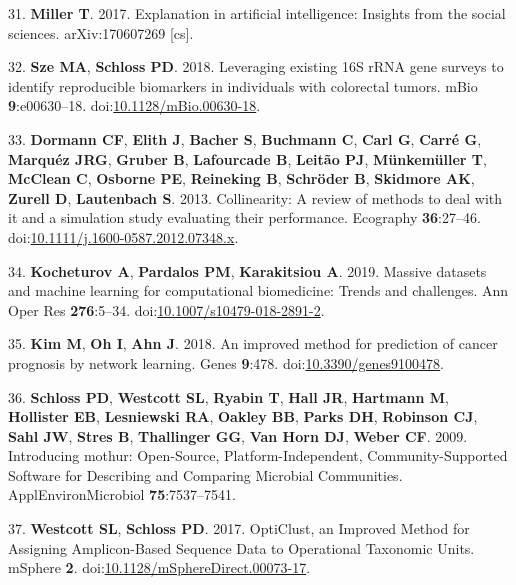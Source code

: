 \documentclass[11pt,]{article}
\begin{document}
\hypertarget{ref-miller_explanation_2017}{}
31. \textbf{Miller T}. 2017. Explanation in artificial intelligence:
Insights from the social sciences. arXiv:170607269 {[}cs{]}.

\hypertarget{ref-sze_leveraging_2018}{}
32. \textbf{Sze MA}, \textbf{Schloss PD}. 2018. Leveraging existing 16S
rRNA gene surveys to identify reproducible biomarkers in individuals
with colorectal tumors. mBio \textbf{9}:e00630--18.
doi:\href{https://doi.org/10.1128/mBio.00630-18}{10.1128/mBio.00630-18}.

\hypertarget{ref-dormann_collinearity:_2013}{}
33. \textbf{Dormann CF}, \textbf{Elith J}, \textbf{Bacher S},
\textbf{Buchmann C}, \textbf{Carl G}, \textbf{Carré G}, \textbf{Marquéz
JRG}, \textbf{Gruber B}, \textbf{Lafourcade B}, \textbf{Leitão PJ},
\textbf{Münkemüller T}, \textbf{McClean C}, \textbf{Osborne PE},
\textbf{Reineking B}, \textbf{Schröder B}, \textbf{Skidmore AK},
\textbf{Zurell D}, \textbf{Lautenbach S}. 2013. Collinearity: A review
of methods to deal with it and a simulation study evaluating their
performance. Ecography \textbf{36}:27--46.
doi:\href{https://doi.org/10.1111/j.1600-0587.2012.07348.x}{10.1111/j.1600-0587.2012.07348.x}.

\hypertarget{ref-kocheturov_massive_2019}{}
34. \textbf{Kocheturov A}, \textbf{Pardalos PM}, \textbf{Karakitsiou A}.
2019. Massive datasets and machine learning for computational
biomedicine: Trends and challenges. Ann Oper Res \textbf{276}:5--34.
doi:\href{https://doi.org/10.1007/s10479-018-2891-2}{10.1007/s10479-018-2891-2}.

\hypertarget{ref-kim_improved_2018}{}
35. \textbf{Kim M}, \textbf{Oh I}, \textbf{Ahn J}. 2018. An improved
method for prediction of cancer prognosis by network learning. Genes
\textbf{9}:478.
doi:\href{https://doi.org/10.3390/genes9100478}{10.3390/genes9100478}.

\hypertarget{ref-schloss_introducing_2009}{}
36. \textbf{Schloss PD}, \textbf{Westcott SL}, \textbf{Ryabin T},
\textbf{Hall JR}, \textbf{Hartmann M}, \textbf{Hollister EB},
\textbf{Lesniewski RA}, \textbf{Oakley BB}, \textbf{Parks DH},
\textbf{Robinson CJ}, \textbf{Sahl JW}, \textbf{Stres B},
\textbf{Thallinger GG}, \textbf{Van Horn DJ}, \textbf{Weber CF}. 2009.
Introducing mothur: Open-Source, Platform-Independent,
Community-Supported Software for Describing and Comparing Microbial
Communities. ApplEnvironMicrobiol \textbf{75}:7537--7541.

\hypertarget{ref-westcott_opticlust_2017}{}
37. \textbf{Westcott SL}, \textbf{Schloss PD}. 2017. OptiClust, an
Improved Method for Assigning Amplicon-Based Sequence Data to
Operational Taxonomic Units. mSphere \textbf{2}.
doi:\href{https://doi.org/10.1128/mSphereDirect.00073-17}{10.1128/mSphereDirect.00073-17}.
\end{document}
